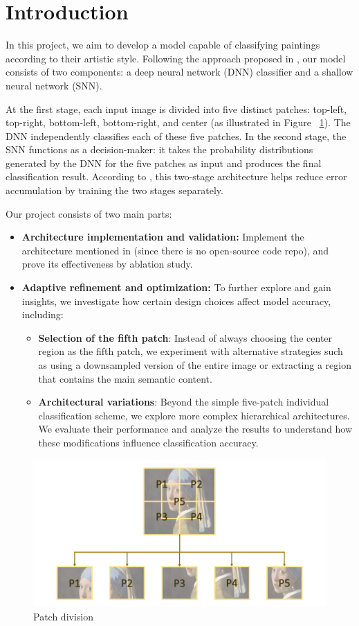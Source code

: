 \section{Introduction}
\label{sec:intro}
In this project, we aim to develop a model capable of classifying paintings according to their artistic style. Following the approach proposed in \cite{imran2023artistic}, our model consists of two components: a deep neural network (DNN) classifier and a shallow neural network (SNN).

At the first stage, each input image is divided into five distinct patches:
top-left, top-right, bottom-left, bottom-right, and center (as illustrated in
Figure ~\ref{fig:patch_division}). The DNN independently classifies each of these five patches. In the
second stage, the SNN functions as a decision-maker: it takes the probability
distributions generated by the DNN for the five patches as input and produces
the final classification result. According to \cite{imran2023artistic}, this
two-stage architecture helps reduce error accumulation by training the two
stages separately.

Our project consists of two main parts:
\begin{itemize}
  \item \textbf{Architecture implementation and validation:} Implement the architecture mentioned in \cite{imran2023artistic} (since there is no open-source code repo), and prove its effectiveness by ablation study.
  \item \textbf{Adaptive refinement and optimization:} To further explore and gain insights, we investigate how certain design choices affect model accuracy, including:
        \begin{itemize}
          \item \textbf{Selection of the fifth patch}: Instead of always choosing the center region as the fifth patch, we experiment with alternative strategies such as using a downsampled version of the entire image or extracting a region that contains the main semantic content.
          \item \textbf{Architectural variations}: Beyond the simple five-patch individual classification scheme, we explore more complex hierarchical architectures. We evaluate their performance and analyze the results to understand how these modifications influence classification accuracy.
        \end{itemize}
\end{itemize}
\begin{figure}[h]

  \centering
  \includegraphics[scale=1,keepaspectratio,width=.5\textwidth]{patch.png}
  \caption{Patch division}
  \label{fig:patch_division}
\end{figure}